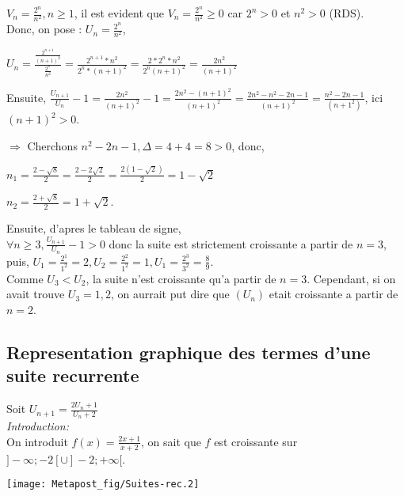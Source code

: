 \documentclass[a4paper,10pt]{book}
\begin{document}
			\newpage

			\exemple $V_n = \frac{2^n}{n^2}, n \geq 1$, il est evident que $V_n = \frac{2^n}{n^2} \geq 0$ car $2^n > 0$ et $n^2 > 0$ (RDS).\\
			Donc, on pose : $U_n = \frac{2^n}{n^2}$,
			\begin{description}
				\item $U_n = \frac{\frac{2^{n+1}}{(n+1)^2}}{\frac{2^n}{n^2}} =  \frac{2^{n+1}*n^2}{2^n * (n+1)^2} = \frac{2*2^n*n^2}{2^n(n+1)^2} = \frac{2n^2}{(n+1)^2}$
				\item Ensuite, $\frac{U_{n+1}}{U_n} - 1 = \frac{2n^2}{(n+1)^2} - 1 = \frac{2n^2-(n+1)^2}{(n+1)^2} = \frac{2n^2 - n^2 - 2n - 1}{(n+1)^2} = \frac{n^2-2n-1}{(n+1^2)}$, ici $(n+1)^2 > 0$.
			\end{description}
			$\Rightarrow$ Cherchons $n^2 - 2n - 1, \Delta = 4 + 4 = 8 > 0$, donc,
			\begin{description}
				\item $n_1 = \frac{2 - \sqrt{8}}{2} = \frac{2 - 2\sqrt{2}}{2} = \frac{2(1 - \sqrt{2})}{2} = 1 - \sqrt{2}$
				\item $n_2 = \frac{2 + \sqrt{8}}{2} = 1 + \sqrt{2}$.
			\end{description}
			Ensuite, d'apres le tableau de signe,\\
			$\forall n \geq 3, \frac{U_{n+1}}{U_n} - 1 > 0$ donc la suite est strictement croissante a partir de $n=3$,\\
			puis, $U_1 = \frac{2^1}{1^2} = 2, U_2 = \frac{2^2}{1^2} = 1, U_1 = \frac{2^3}{3^2} = \frac{8}{9}$.\\
			Comme $U_3 < U_2$, la suite n'est croissante qu'a partir de $n=3$. Cependant, si on avait trouve $U_3 = 1,2$, on aurrait put dire que $(U_n)$ etait croissante a partir de $n=2$.

			\subsection{Representation graphique des termes d'une suite recurrente}
			Soit $U_{n+1} = \frac{2U_n + 1}{U_n +2}$\\
			\smallskip
			\textit{Introduction:}\\
			On introduit $f(x) = \frac{2x+1}{x+2}$, on sait que $f$ est croissante sur $]-\infty;-2[\cup]-2;+\infty[$.
			\begin{center}
					\texttt{[image: Metapost\_fig/Suites-rec.2]}
			\end{center}
\end{document}
